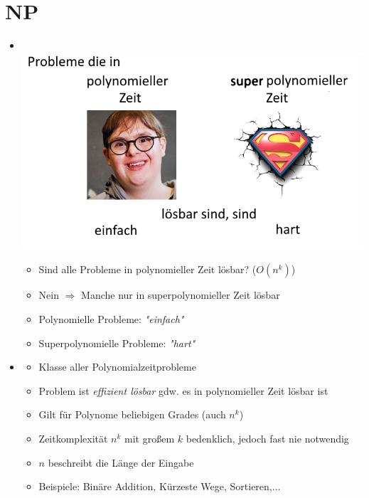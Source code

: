 \documentclass[
    12pt,
    a4paper,
    ngerman,
    color=3b,%
    marginpar=false,
    colorback=false,
    leqno,
]{tudaexercise}
\begin{document}
\section{NP}
\begin{itemize}
    \item {}\\
    \includegraphics[width=.5\textwidth]{pictures/npmeme.png}
          \begin{itemize}
              \item Sind alle Probleme in polynomieller Zeit lösbar? ($O(n^k)$)
              \item Nein $\Rightarrow$ Manche nur in superpolynomieller Zeit lösbar
              \item Polynomielle Probleme: \textit{\string"einfach\string"}
              \item Superpolynomielle Probleme: \textit{\string"hart\string"}
          \end{itemize}

    \item {}
          \begin{itemize}
              \item Klasse aller Polynomialzeitprobleme
              \item Problem ist \textit{effizient lösbar} gdw. es in polynomieller Zeit lösbar ist
              \item Gilt für Polynome beliebigen Grades (auch $n^k$)
              \item Zeitkomplexität $n^k$ mit gro\ss em $k$ bedenklich, jedoch fast nie notwendig
              \item $n$ beschreibt die Länge der Eingabe
              \item Beispiele: Binäre Addition, Kürzeste Wege, Sortieren,...
          \end{itemize}


\end{itemize}
\end{document}
